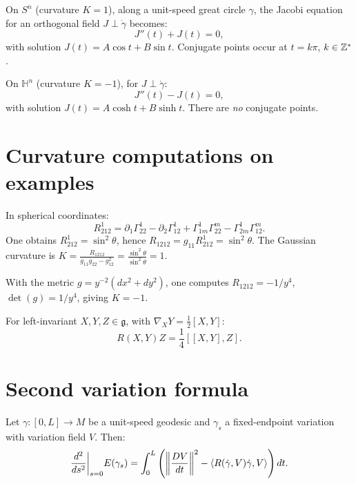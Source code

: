 \begin{example}
On $S^n$ (curvature $K = 1$), along a unit-speed great circle $\gamma$, the
Jacobi equation for an orthogonal field $J \perp \dot\gamma$ becomes:
\[
    J''(t) + J(t) = 0,
\]
with solution $J(t) = A\cos t + B\sin t$. Conjugate points occur at
$t = k\pi$, $k \in \mathbb{Z}^*$.
\end{example}

\begin{example}
On $\mathbb{H}^n$ (curvature $K = -1$), for $J \perp \dot\gamma$:
\[
    J''(t) - J(t) = 0,
\]
with solution $J(t) = A\cosh t + B\sinh t$. There are \emph{no} conjugate points.
\end{example}

\section{Curvature computations on examples}

\begin{example}[Curvature of $S^2$]
In spherical coordinates:
\[
    R^1_{212} = \partial_1\Gamma^1_{22} - \partial_2\Gamma^1_{12}
    + \Gamma^1_{1m}\Gamma^m_{22} - \Gamma^1_{2m}\Gamma^m_{12}.
\]
One obtains $R^1_{212} = \sin^2\!\theta$, hence
$R_{1212} = g_{11} R^1_{212} = \sin^2\!\theta$. The Gaussian curvature is
$K = \frac{R_{1212}}{g_{11}g_{22} - g_{12}^2} = \frac{\sin^2\theta}{\sin^2\theta} = 1$.
\end{example}

\begin{example}
With the metric $g = y^{-2}(dx^2 + dy^2)$, one computes $R_{1212} = -1/y^4$,
$\det(g) = 1/y^4$, giving $K = -1$.
\end{example}

\begin{example}
For left-invariant $X, Y, Z \in \mathfrak{g}$, with $\nabla_X Y = \frac{1}{2}[X,Y]$:
\[
    R(X,Y)Z = \frac{1}{4}[[X,Y],Z].
\]
\end{example}

\section{Second variation formula}

\begin{theorem}
Let $\gamma : [0, L] \to M$ be a unit-speed geodesic and $\gamma_s$ a fixed-endpoint
variation with variation field $V$. Then:
\[
    \frac{d^2}{ds^2}\bigg|_{s=0} E(\gamma_s) = \int_0^L \left(
    \left\| \frac{DV}{dt} \right\|^2 - \langle R(\dot\gamma, V)\dot\gamma, V \rangle\right) dt.
\]
\end{theorem}

